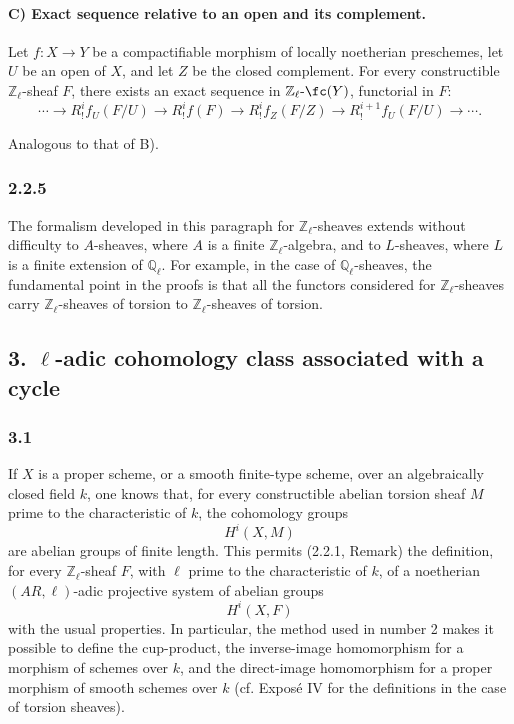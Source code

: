 \paragraph{C) Exact sequence relative to an open and its complement.}
Let \(f:X\to Y\) be a compactifiable morphism of locally noetherian preschemes, let \(U\) be an open of \(X\), and let \(Z\) be the closed complement. For every constructible \(\mathbb Z_\ell\)-sheaf \(F\), there exists an exact sequence in \(\mathbb Z_\ell\text{-}\fc(Y)\), functorial in \(F\):
\[
\cdots\longrightarrow R^i_!f_U(F/U)
\longrightarrow R^i_!f(F)
\longrightarrow R^i_!f_Z(F/Z)
\longrightarrow R^{i+1}_!f_U(F/U)
\longrightarrow\cdots .
\]

\begin{prooftext}[Proof]
Analogous to that of B).
\end{prooftext}

\subsubsection*{2.2.5}
The formalism developed in this paragraph for \(\mathbb Z_\ell\)-sheaves extends without difficulty to \(A\)-sheaves, where \(A\) is a finite \(\mathbb Z_\ell\)-algebra, and to \(L\)-sheaves, where \(L\) is a finite extension of \(\mathbb Q_\ell\). For example, in the case of \(\mathbb Q_\ell\)-sheaves, the fundamental point in the proofs is that all the functors considered for \(\mathbb Z_\ell\)-sheaves carry \(\mathbb Z_\ell\)-sheaves of torsion to \(\mathbb Z_\ell\)-sheaves of torsion.

\subsection*{3. \(\ell\)-adic cohomology class associated with a cycle}

\subsubsection*{3.1}
If \(X\) is a proper scheme, or a smooth finite-type scheme, over an algebraically closed field \(k\), one knows that, for every constructible abelian torsion sheaf \(M\) prime to the characteristic of \(k\), the cohomology groups
\[
H^i(X,M)
\]
are abelian groups of finite length. This permits (2.2.1, Remark) the definition, for every \(\mathbb Z_\ell\)-sheaf \(F\), with \(\ell\) prime to the characteristic of \(k\), of a noetherian \((AR,\ell)\)-adic projective system of abelian groups
\[
H^i(X,F)
\]
with the usual properties. In particular, the method used in number 2 makes it possible to define the cup-product, the inverse-image homomorphism for a morphism of schemes over \(k\), and the direct-image homomorphism for a proper morphism of smooth schemes over \(k\) (cf. Exposé IV for the definitions in the case of torsion sheaves).

